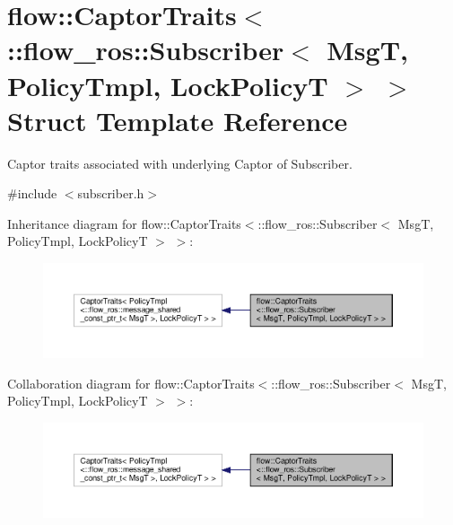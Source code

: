\hypertarget{structflow_1_1_captor_traits_3_1_1flow__ros_1_1_subscriber_3_01_msg_t_00_01_policy_tmpl_00_01_lock_policy_t_01_4_01_4}{}\section{flow\+:\+:Captor\+Traits$<$\+:\+:flow\+\_\+ros\+:\+:Subscriber$<$ MsgT, Policy\+Tmpl, Lock\+PolicyT $>$ $>$ Struct Template Reference}
\label{structflow_1_1_captor_traits_3_1_1flow__ros_1_1_subscriber_3_01_msg_t_00_01_policy_tmpl_00_01_lock_policy_t_01_4_01_4}


Captor traits associated with underlying Captor of Subscriber.  




{\ttfamily \#include $<$subscriber.\+h$>$}



Inheritance diagram for flow\+:\+:Captor\+Traits$<$\+:\+:flow\+\_\+ros\+:\+:Subscriber$<$ MsgT, Policy\+Tmpl, Lock\+PolicyT $>$ $>$\+:\nopagebreak
\begin{figure}[H]
\begin{center}
\leavevmode
\includegraphics[width=350pt]{structflow_1_1_captor_traits_3_1_1flow__ros_1_1_subscriber_3_01_msg_t_00_01_policy_tmpl_00_01_lo021fb8bc1c700e9be0f42e0842d3e489}
\end{center}
\end{figure}


Collaboration diagram for flow\+:\+:Captor\+Traits$<$\+:\+:flow\+\_\+ros\+:\+:Subscriber$<$ MsgT, Policy\+Tmpl, Lock\+PolicyT $>$ $>$\+:\nopagebreak
\begin{figure}[H]
\begin{center}
\leavevmode
\includegraphics[width=350pt]{structflow_1_1_captor_traits_3_1_1flow__ros_1_1_subscriber_3_01_msg_t_00_01_policy_tmpl_00_01_lo6f803b65cacd3db302267201dc975f50}
\end{center}
\end{figure}


